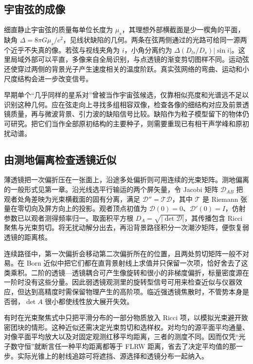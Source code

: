 \subsection{宇宙弦的成像}

细直静止宇宙弦的质量每单位长度为 $\mu_s$，其理想外部横截面是少一楔角的平面，缺角 $\Delta=8\pi G\mu_s/c^2$，见线状缺陷的几何。两条在弦两侧通过的光路可给同一源两个近乎不失真的像。若弦与视线夹角为 $i$，小角分离约为 $\Delta(D_{ls}/D_s)|\sin i|$。这里局域外部可以平直，多像来自全局识别，与点透镜的渐变剪切图样不同。运动弦还使穿过两侧的背景光子产生速度相关的温度阶跃。真实弦网络的弯曲、运动和小尺度结构会进一步改变信号。

早期单个“几乎同样的星系对”曾被当作宇宙弦候选，仅靠相似亮度和光谱远不足以识别这种几何。应在弦走向上寻找多组相容双像，检查各像的细结构对应及前景透镜质量，再与微波背景、引力波的缺陷信号比较。缺陷作为粒子模型留下的物体仍可研究。把它们当作全部原初结构的主要种子，则需要重现已有相干声学峰和原初扰动谱。

\subsection{由测地偏离检查透镜近似}

薄透镜把一次偏折压在一张面上，沿途多处偏折则可用连续的光束矩阵。测地偏离的一般形式见第一章。沿光线选平行输运的两个屏矢量，令 Jacobi 矩阵 $\mathcal D_{AB}$ 把观者处角差映为光束横截面的固有分离，满足 $\mathcal D''=\mathcal T\mathcal D$，其中 $\mathcal T$ 是 Riemann 张量在零切向及屏方向上的投影。观者顶点初值为 $\mathcal D(0)=0$、$\mathcal D'(0)=I$，仿射参数已以观者测得频率归一。取面积平方根 $D_A=\sqrt{|\det\mathcal D|}$，其传播包含 Ricci 聚焦与光束剪切。将无扰动解分出去，再沿背景路径积分一次潮汐矩阵，便恢复弱透镜的距离核。

连续路径中，第一次偏折会移动第二次偏折所在的位置，且两处剪切矩阵一般不对易。在 Born 近似中把它们都在直背景射线上求值并只保留一次项，恰好舍去了这类乘积。二阶的透镜—透镜耦合可产生像旋转和很小的非梯度偏折，标量密度源在一阶时没有这些分量。因此弱透镜观测里的旋转型信号可用来检查近似与仪器效应，但达到高精度时需保留物理产生的高阶项。临近强透镜焦散时，不管势本身是否弱，$\det A$ 很小都使线性放大展开失效。

有时在光束聚焦式中只把平滑分布的一部分物质放入 Ricci 项，以模拟光束避开致密团块的情形。这种近似还需决定光束剪切和选样权。对均匀的源平面平均通量、对像平面平均放大以及对固定观测红移平均距离，三者的测度不同。因而仅凭“光子数守恒”就断言任一种平均距离都等于 FLRW 距离，省去了决定平均值的那一步。实际光锥上的射线追踪可将遮挡、源选择和透镜分布一起纳入。

